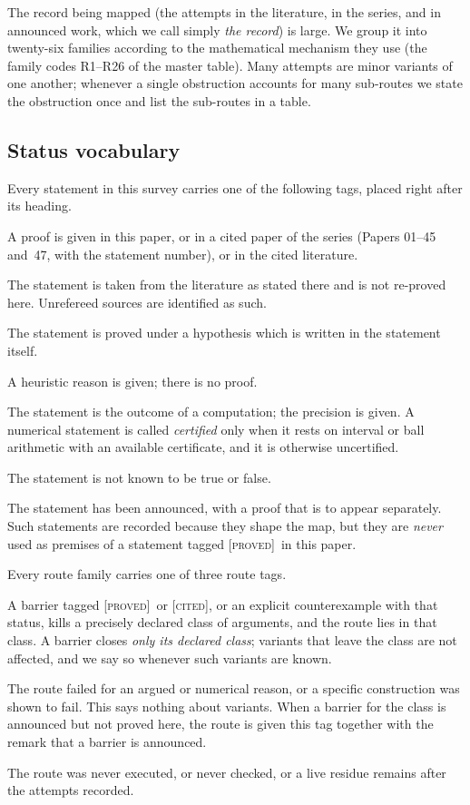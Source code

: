 \documentclass[11pt]{amsart}
\theoremstyle{definition}
\theoremstyle{remark}
\numberwithin{equation}{section}
\newcommand{\stag}[1]{\textsc{[#1]}}
\newcommand{\PROVED}{\stag{proved}}
\newcommand{\CITED}{\stag{cited}}
\newcommand{\COND}{\stag{conditional}}
\newcommand{\ARGUED}{\stag{argued}}
\newcommand{\NUM}{\stag{numerical}}
\newcommand{\OPENQ}{\stag{open}}
\newcommand{\ANNOUNCED}{\stag{announced}}
\newcommand{\rtag}[1]{\textbf{\small\textsf{#1}}}
\newcommand{\closedT}{\rtag{closed by theorem}}
\newcommand{\closedA}{\rtag{closed as attempted}}
\newcommand{\openR}{\rtag{open}}
\begin{document}
The record being mapped (the attempts in the literature, in the series, and in announced work, which we call simply \emph{the record}) is large.
We group it into twenty-six families according to the mathematical
mechanism they use (the family codes R1--R26 of the master table). Many
attempts are minor variants of one another; whenever a single obstruction
accounts for many sub-routes we state the obstruction once and list the
sub-routes in a table.

\subsection{Status vocabulary}\label{w1:sec:status}
Every statement in this survey carries one of the following tags, placed
right after its heading.
\begin{description}[leftmargin=2.2em,style=nextline]
\item[\PROVED] A proof is given in this paper, or in a cited paper of the
  series (Papers 01--45 and~47, with the statement number), or in the cited
  literature.
\item[\CITED] The statement is taken from the literature as stated there and
  is not re-proved here. Unrefereed sources are identified as such.
\item[\COND] The statement is proved under a hypothesis which is written in
  the statement itself.
\item[\ARGUED] A heuristic reason is given; there is no proof.
\item[\NUM] The statement is the outcome of a computation; the precision is
  given. A numerical statement is called \emph{certified} only when it rests
  on interval or ball arithmetic with an available certificate, and it is
  otherwise uncertified.
\item[\OPENQ] The statement is not known to be true or false.
\item[\ANNOUNCED] The statement has been announced, with a proof that is to
  appear separately. Such statements are recorded because they shape the map,
  but they are \emph{never} used as premises of a statement tagged \PROVED\ in
  this paper.
\end{description}
Every route family carries one of three route tags.
\begin{description}[leftmargin=2.2em,style=nextline]
\item[\closedT] A barrier tagged \PROVED\ or \CITED, or an explicit
  counterexample with that status, kills a precisely declared class of
  arguments, and the route lies in that class. A barrier closes \emph{only its
  declared class}; variants that leave the class are not affected, and we say
  so whenever such variants are known.
\item[\closedA] The route failed for an argued or numerical reason, or a
  specific construction was shown to fail. This says nothing about variants.
  When a barrier for the class is announced but not proved here, the route is
  given this tag together with the remark that a barrier is announced.
\item[\openR] The route was never executed, or never checked, or a live
  residue remains after the attempts recorded.
\end{description}
\end{document}
